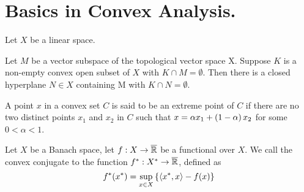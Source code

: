\chapter{Basics in Convex Analysis.}
\begin{definition}[Variety]
\end{definition}
\begin{definition}[Convexity]
Let $X$ be a linear space. 
\end{definition}
\begin{definition}
\end{definition}
\begin{theorem}
\end{theorem}

\begin{theorem}
	Let $M$ be a vector subspace of the topological vector space X. Suppose $K$ is a non-empty convex open subset of $X$ with $K\cap M=\emptyset$. Then there is a closed hyperplane $N \in X$ containing M with $K \cap N = \emptyset$.
\end{theorem}

\begin{definition}[Cone]
	
\end{definition}


\begin{definition}
A point $x$ in a convex set $C$ is said to be an extreme point of $C$ if there are no two distinct points $x_1$ and $x_2$ in $C$ such that $x = \alpha x_1 + \left( 1-\alpha \right)x_2$ for some $0<\alpha <1$.
\end{definition}

\begin{definition}
Let $X$ be a Banach space, let $f:X\rightarrow \overline{\mathbb{R}}$ be a functional over $X$. We call the convex conjugate to the function ${f}^*: {X}^*\rightarrow \overline{\mathbb{R}}$, defined as
\begin{equation*}
	{f}^*({x}^*)=\sup_{x\in X} \left\lbrace \left\langle {x}^*, x \right\rangle-f(x) \right\rbrace
\end{equation*}	
\end{definition}


